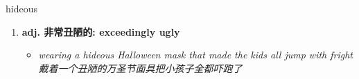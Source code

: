 
\begin{frame}
{\huge hideous}
\begin{center}
\begin{enumerate}\Large
  \item \textbf{adj. 非常丑陋的: exceedingly ugly}
  \begin{itemize}
    \item \em{\Large{wearing a hideous Halloween mask that made the kids all jump with fright戴着一个丑陋的万圣节面具把小孩子全都吓跑了}}
  \end{itemize}
\end{enumerate}
\end{center}
\end{frame}
